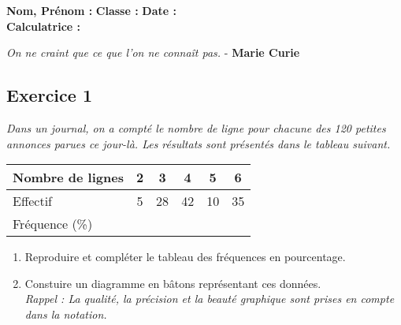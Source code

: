 \documentclass[12pt]{article}
\begin{document}

\textbf{Nom, Prénom :} \hspace{8cm} \textbf{Classe :} \hspace{3cm} \textbf{Date :}\\
\textbf{Calculatrice :}

\begin{center}
  \textit{On ne craint que ce que l'on ne connaît pas.}  - \textbf{Marie Curie}
\end{center}


\setlength{\columnseprule}{1pt}

\begin{multicols}{2}

  \subsection*{Exercice 1} 

  \textit{Dans un journal, on a compté le nombre de ligne pour chacune des 120 petites annonces parues ce jour-là. Les résultats sont présentés dans le tableau suivant.}

  \begin{center}
    \begin{tabular}{| l || c | c | c | c | c | }
      \hline
      Nombre de lignes  & 2 &  3 &  4 &  5 &  6 \\
      \hline
      Effectif          & 5 & 28 & 42 & 10 & 35 \\ 
      \hline
      Fréquence (\%)    &   &    &    &    &    \\
      \hline
    \end{tabular}
  \end{center}

  \begin{enumerate}
  \item Reproduire et compléter le tableau des fréquences en pourcentage.
  \item Constuire un diagramme en bâtons représentant ces données. \\
    \textit{Rappel : La qualité, la précision et la beauté graphique sont prises en compte dans la notation.}

  \end{enumerate}

\end{multicols}
\end{document}
